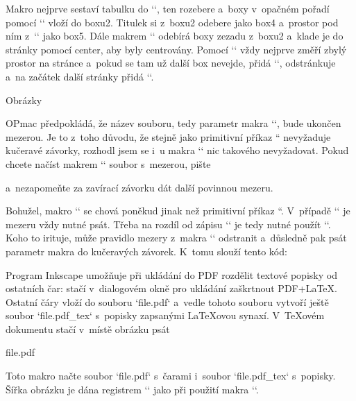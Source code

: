 Makro nejprve sestaví tabulku do ``, ten rozebere a~boxy v~opačném pořadí pomocí `\revertbox` vloží do boxu2. Titulek si z~boxu2 odebere jako box4 a~prostor pod ním z~`\tskip` jako box5. Dále makrem `\printboxes` odebírá boxy zezadu z~boxu2 a~klade je do stránky pomocí {\tt{}}center, aby byly centrovány. Pomocí `\whatfree` vždy nejprve změří zbylý prostor na stránce a~pokud se tam už další box nevejde, přidá `\crule`, odstránkuje a~na začátek další stránky přidá `\crule{}\crule{}`. 



 \sec Obrázky 

 


OPmac předpokládá, že název souboru, tedy parametr makra `\inspic`, bude ukončen mezerou. Je to z~toho důvodu, že stejně jako primitivní příkaz `` nevyžaduje kučeravé závorky, rozhodl jsem se i~u makra `\inspic` nic takového nevyžadovat. Pokud chcete načíst makrem `\inspic` soubor s~mezerou, pište 

\begtt
{} 
\endtt


a~nezapomeňte za zavírací závorku dát další povinnou mezeru. 



Bohužel, makro `\inspic` se chová poněkud jinak než primitivní příkaz ``. V~případě `\inspic` je mezeru vždy nutné psát. Třeba na rozdíl od zápisu `\line{}` je tedy nutné použít ``. Koho to irituje, může pravidlo mezery z~makra `\inspic` odstranit a~důsledně pak psát parametr makra do kučeravých závorek. K~tomu slouží tento kód: 

\begtt
\expandafter\def\expandafter\inspic\expandafter#\expandafter1\expandafter{\inspic{#1} } 
\endtt

 


Program Inkscape umožňuje při ukládání do PDF rozdělit textové popisky od ostatních čar: stačí v~dialogovém okně pro ukládání zaškrtnout PDF+LaTeX. Ostatní čáry vloží do souboru `file.pdf` a~vedle tohoto souboru vytvoří ještě soubor `file.pdf_tex` s~popisky zapsanými LaTeXovou synaxí. V~TeXovém dokumentu stačí v~místě obrázku psát 

\begtt
\inkinspic file.pdf 
\endtt


Toto makro načte soubor `file.pdf` s~čarami i~soubor `file.pdf_tex` s~popisky. Šířka obrázku je dána registrem `\picw` jako při použití makra `\inspic`. 



